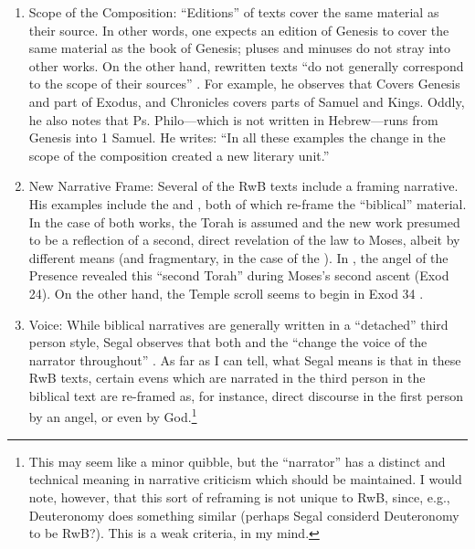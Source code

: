 \begin{enumerate}
\def\labelenumi{\arabic{enumi}.}
\item
  Scope of the Composition: ``Editions'' of texts cover the same
  material as their source. In other words, one expects an edition of
  Genesis to cover the same material as the book of Genesis; pluses and
  minuses do not stray into other works. On the other hand, rewritten
  texts ``do not generally correspond to the scope of their sources''
  \autocite[20]{segal_henze2005}. For example, he observes that
  \jub Covers Genesis and part of Exodus, and Chronicles
  covers parts of Samuel and Kings. Oddly, he also notes that Ps.
  Philo---which is not written in Hebrew---runs from Genesis into 1
  Samuel. He writes: ``In all these examples the change in the scope of
  the composition created a new literary unit.''
  \autocite[20--21]{segal_henze2005}
\item
  New Narrative Frame: Several of the RwB texts include a framing
  narrative. His examples include the \templescroll and
  \jub, both of which re-frame the ``biblical''
  material. In the case of both works, the Torah is assumed and the new
  work presumed to be a reflection of a second, direct revelation of the
  law to Moses, albeit by different means (and fragmentary, in the case
  of the \templescroll). In \jub, the
  angel of the Presence revealed this ``second Torah'' during Moses's
  second ascent (Exod 24). On the other hand, the Temple scroll seems to
  begin in Exod 34 \autocite[22]{segal_henze2005}.
\item
  Voice: While biblical narratives are generally written in a
  ``detached'' third person style, Segal observes that both
  \jub and the \templescroll ``change
  the voice of the narrator throughout'' \autocite[22]{segal_henze2005}.
  As far as I can tell, what Segal means is that in these RwB texts,
  certain evens which are narrated in the third person in the biblical
  text are re-framed as, for instance, direct discourse in the first
  person by an angel, or even by God.\footnote{This may seem like a
    minor quibble, but the ``narrator'' has a distinct and technical
    meaning in narrative criticism which should be maintained. I would
    note, however, that this sort of reframing is not unique to RwB,
    since, e.g., Deuteronomy does something similar (perhaps Segal
    considerd Deuteronomy to be RwB?). This is a weak criteria, in my
    mind.}
\end{enumerate}

